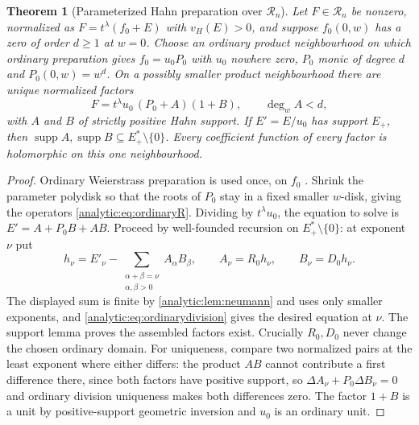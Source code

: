 \documentclass[11pt,letterpaper]{article}
\newtheorem{theorem}{Theorem}[section]
\theoremstyle{definition}
\theoremstyle{remark}
\newcommand{\RR}{\mathscr R}
\newcommand{\supp}{\operatorname{supp}}
\newcommand{\vH}{v_{\!H}}
\numberwithin{equation}{section}
\begin{document}
\begin{theorem}[Parameterized Hahn preparation over $\RR_n$]
\label{analytic:thm:prepR}
Let $F\in\RR_n$ be nonzero, normalized as $F=t^\lambda(f_0+E)$ with
$\vH(E)>0$, and suppose $f_0(0,w)$ has a zero of order $d\ge1$ at $w=0$.
Choose an ordinary product neighbourhood on which ordinary preparation gives
$f_0=u_0P_0$ with $u_0$ nowhere zero, $P_0$ monic of degree $d$ and
$P_0(0,w)=w^d$. On a possibly smaller product neighbourhood there are unique
normalized factors
\begin{equation}\label{analytic:eq:prepR}
 F=t^\lambda u_0\,(P_0+A)(1+B),\qquad \deg_wA<d,
\end{equation}
with $A$ and $B$ of strictly positive Hahn support. If $E'=E/u_0$ has
support $E_+$, then $\supp A,\supp B\subseteq E_+^*\setminus\{0\}$. Every
coefficient function of every factor is holomorphic on this one
neighbourhood.
\end{theorem}
\begin{proof}
Ordinary Weierstrass preparation is used once, on $f_0$
\cite{GrauertRemmert}. Shrink the parameter polydisk so that the roots of
$P_0$ stay in a fixed smaller $w$-disk, giving the operators
\eqref{analytic:eq:ordinaryR}. Dividing by $t^\lambda u_0$, the equation to
solve is $E'=A+P_0B+AB$. Proceed by well-founded recursion on
$E_+^*\setminus\{0\}$: at exponent $\nu$ put
\begin{equation}\label{analytic:eq:preprecursion}
 h_\nu=E'_\nu-\!\!\sum_{\substack{\alpha+\beta=\nu\\ \alpha,\beta>0}}\!\!
 A_\alpha B_\beta,\qquad
 A_\nu=R_0h_\nu,\qquad B_\nu=D_0h_\nu .
\end{equation}
The displayed sum is finite by \cref{analytic:lem:neumann} and uses only
smaller exponents, and \eqref{analytic:eq:ordinarydivision} gives the
desired equation at $\nu$. The support lemma proves the assembled factors
exist. Crucially $R_0,D_0$ never change the chosen ordinary domain. For
uniqueness, compare two normalized pairs at the least exponent where either
differs: the product $AB$ cannot contribute a first difference there, since
both factors have positive support, so $\Delta A_\nu+P_0\Delta B_\nu=0$ and
ordinary division uniqueness makes both differences zero. The factor $1+B$
is a unit by positive-support geometric inversion and $u_0$ is an ordinary
unit.
\end{proof}
\end{document}
